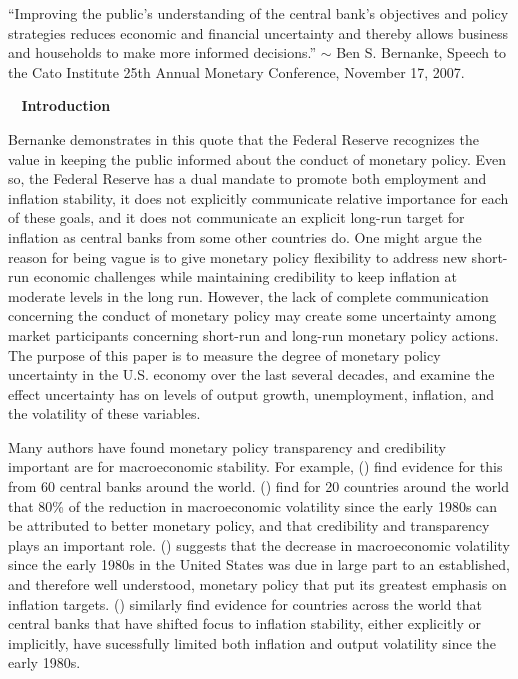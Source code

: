 \documentclass[12pt]{article}
\newcommand{\citee}[1]{\citeauthor{#1} (\citeyear{#1})}
\renewcommand{\section}[1]{\addtocounter{section}{1} \begin{center}\textbf{\thesection~ #1}\end{center}}
\begin{document}
\noindent ``Improving the public's understanding of the central bank's objectives and policy strategies reduces economic and financial uncertainty and thereby allows business and households to make more informed decisions.''
$\sim$ Ben S. Bernanke, Speech to the Cato Institute 25th Annual Monetary Conference, November 17, 2007.

\section{Introduction}
Bernanke demonstrates in this quote that the Federal Reserve recognizes the value in keeping the public informed about the conduct of monetary policy.  Even so, the Federal Reserve has a dual mandate to promote both employment and inflation stability, it does not explicitly communicate relative importance for each of these goals, and it does not communicate an explicit long-run target for inflation as central banks from some other countries do.  One might argue the reason for being vague is to give monetary policy flexibility to address new short-run economic challenges while maintaining credibility to keep inflation at moderate levels in the long run.  However, the lack of complete communication concerning the conduct of monetary policy may create some uncertainty among market participants concerning short-run and long-run monetary policy actions.  The purpose of this paper is to measure the degree of monetary policy uncertainty in the U.S. economy over the last several decades, and examine the effect uncertainty has on levels of output growth, unemployment, inflation, and the volatility of these variables.

Many authors have found monetary policy transparency and credibility important are for macroeconomic stability.  For example, \citee{cecchetti_krause2002} find evidence for this from 60 central banks around the world.  \citee{cecchetti2006} find for 20 countries around the world that 80\% of the reduction in macroeconomic volatility since the early 1980s can be attributed to better monetary policy, and that credibility and transparency plays an important role.  \citee{bernanke1997} suggests that the decrease in macroeconomic volatility since the early 1980s in the United States was due in large part to an established, and therefore well understood, monetary policy that put its greatest emphasis on inflation targets.  \citee{cecchetti_ehrmann2002} similarly find evidence for countries across the world that central banks that have shifted focus to inflation stability, either explicitly or implicitly, have sucessfully limited both inflation and output volatility since the early 1980s.
\end{document}
